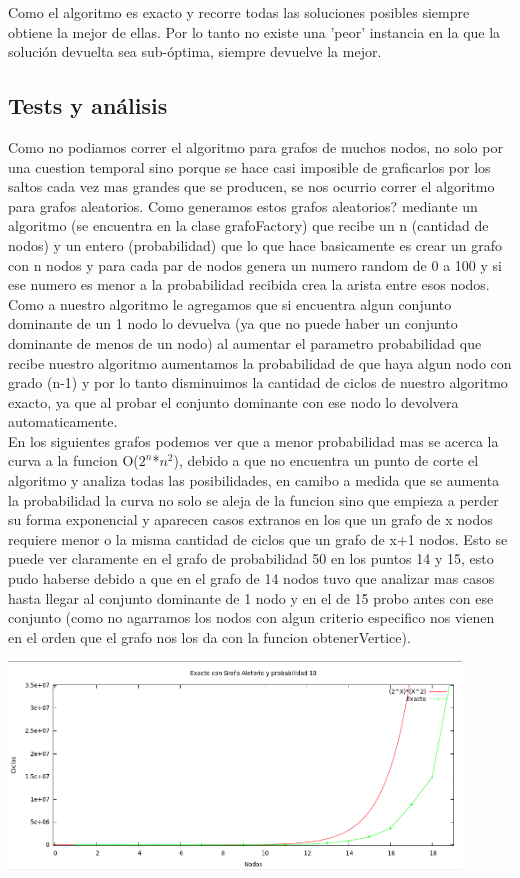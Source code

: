 Como el algoritmo es exacto y recorre todas las soluciones posibles siempre obtiene la mejor de ellas. Por lo tanto no existe una 'peor' instancia
en la que la solución devuelta sea sub-óptima, siempre devuelve la mejor. 

\subsection{Tests y análisis}
Como no podiamos correr el algoritmo para grafos de muchos nodos, no solo por una cuestion temporal sino porque se hace casi imposible de graficarlos por los saltos cada vez mas grandes que se producen, se nos ocurrio correr el algoritmo para grafos aleatorios. Como generamos estos grafos aleatorios? mediante un algoritmo (se encuentra en la clase grafoFactory) que recibe un n (cantidad de nodos) y un entero (probabilidad)  que lo que hace basicamente es crear un grafo con n nodos y para cada par de nodos genera un numero random de 0 a 100 y si ese numero es menor a la probabilidad recibida crea la arista entre esos nodos.\\
Como a nuestro algoritmo le agregamos que si encuentra algun conjunto dominante de un 1 nodo lo devuelva (ya que no puede haber un conjunto dominante de menos de un nodo) al aumentar el parametro probabilidad que recibe nuestro algoritmo aumentamos la probabilidad de que haya algun nodo con grado (n-1) y por lo tanto disminuimos la cantidad de ciclos de nuestro algoritmo exacto, ya que al probar el conjunto dominante con ese nodo lo devolvera automaticamente.\\
En los siguientes grafos podemos ver que a menor probabilidad mas se acerca la curva a la funcion O($2^n$*$n^2$), debido a que no encuentra un punto de corte el algoritmo y analiza todas las posibilidades, en camibo a medida que se aumenta la probabilidad la curva no solo se aleja de la funcion sino que empieza a perder su forma exponencial y aparecen casos extranos en los que un grafo de x nodos requiere menor o la misma cantidad de ciclos que un grafo de x+1 nodos. Esto se puede ver claramente en el grafo de probabilidad 50 en los puntos 14 y 15, esto pudo haberse debido a que en el grafo de 14 nodos tuvo que analizar mas casos hasta llegar al conjunto dominante de 1 nodo y en el de 15 probo antes con ese conjunto (como no agarramos los nodos con algun criterio especifico nos vienen en el orden que el grafo nos los da con la funcion obtenerVertice). 

\begin {center}
\includegraphics[width=12cm]{./graficos/exacto-proba-10.png}
\end {center} 

